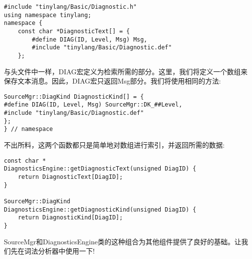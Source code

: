 \begin{lstlisting}[caption={}]
#include "tinylang/Basic/Diagnostic.h"
using namespace tinylang;
namespace {
	const char *DiagnosticText[] = {
		#define DIAG(ID, Level, Msg) Msg,
		#include "tinylang/Basic/Diagnostic.def"
	};
\end{lstlisting}

与头文件中一样，DIAG宏定义为检索所需的部分。这里，我们将定义一个数组来保存文本消息。因此，DIAG宏只返回Msg部分。我们将使用相同的方法:\par

\begin{lstlisting}[caption={}]
SourceMgr::DiagKind DiagnosticKind[] = {
#define DIAG(ID, Level, Msg) SourceMgr::DK_##Level,
#include "tinylang/Basic/Diagnostic.def"
};
} // namespace
\end{lstlisting}

不出所料，这两个函数都只是简单地对数组进行索引，并返回所需的数据:\par

\begin{lstlisting}[caption={}]
const char *
DiagnosticsEngine::getDiagnosticText(unsigned DiagID) {
	return DiagnosticText[DiagID];
}

SourceMgr::DiagKind
DiagnosticsEngine::getDiagnosticKind(unsigned DiagID) {
	return DiagnosticKind[DiagID];
}
\end{lstlisting}

SourceMgr和DiagnosticsEngine类的这种组合为其他组件提供了良好的基础。让我们先在词法分析器中使用一下!\par




















































